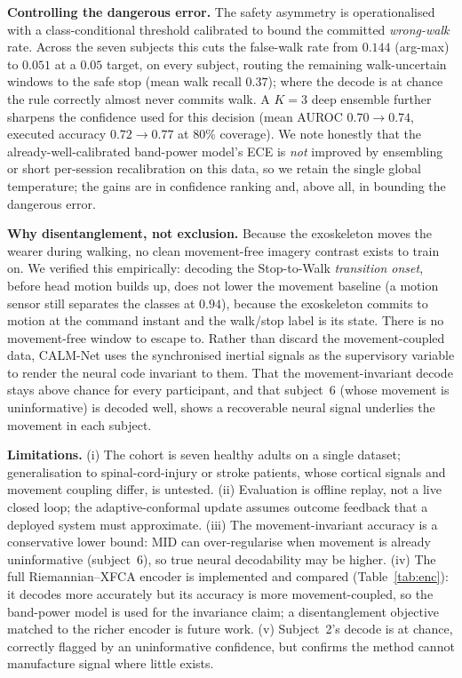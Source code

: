 \documentclass[conference]{IEEEtran}
\begin{document}
\textbf{Controlling the dangerous error.} The safety asymmetry is operationalised
with a class-conditional threshold calibrated to bound the committed \emph{wrong-walk}
rate. Across the seven subjects this cuts the false-walk rate from $0.144$ (arg-max)
to $0.051$ at a $0.05$ target, on every subject, routing the remaining walk-uncertain
windows to the safe stop (mean walk recall $0.37$); where the decode is at chance the
rule correctly almost never commits walk. A $K{=}3$ deep ensemble further sharpens the
confidence used for this decision (mean AUROC $0.70\rightarrow0.74$, executed accuracy
$0.72\rightarrow0.77$ at $80\%$ coverage). We note honestly that the
already-well-calibrated band-power model's ECE is \emph{not} improved by ensembling or
short per-session recalibration on this data, so we retain the single global
temperature; the gains are in confidence ranking and, above all, in bounding the
dangerous error.

\textbf{Why disentanglement, not exclusion.} Because the exoskeleton moves the wearer
during walking, no clean movement-free imagery contrast exists to train on. We
verified this empirically: decoding the Stop-to-Walk \emph{transition onset}, before
head motion builds up, does not lower the movement baseline (a motion sensor still
separates the classes at $0.94$), because the exoskeleton commits to motion at the
command instant and the walk/stop label is its state. There is no movement-free
window to escape to. Rather than discard the movement-coupled data, CALM-Net uses the
synchronised inertial signals as the supervisory variable to render the neural code
invariant to them. That
the movement-invariant decode stays above chance for every participant, and that
subject~6 (whose movement is uninformative) is decoded well, shows a recoverable
neural signal underlies the movement in each subject.

\textbf{Limitations.} (i) The cohort is seven healthy adults on a single dataset;
generalisation to spinal-cord-injury or stroke patients, whose cortical signals and
movement coupling differ, is untested. (ii) Evaluation is offline replay, not a live
closed loop; the adaptive-conformal update assumes outcome feedback that a deployed
system must approximate. (iii) The movement-invariant accuracy is a conservative lower
bound: MID can over-regularise when movement is already uninformative (subject~6), so
true neural decodability may be higher. (iv) The full Riemannian--XFCA encoder is
implemented and compared (Table~\ref{tab:enc}): it decodes more accurately but its
accuracy is more movement-coupled, so the band-power model is used for the invariance
claim; a disentanglement objective matched to the richer encoder is future work.
(v) Subject~2's decode
is at chance, correctly flagged by an uninformative confidence, but confirms the
method cannot manufacture signal where little exists.
\end{document}

